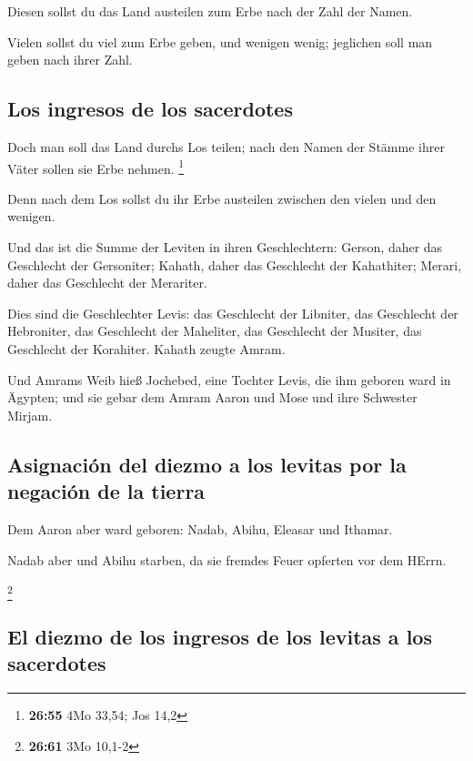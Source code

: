  Diesen sollst du das Land austeilen zum Erbe nach der
Zahl der Namen.

 Vielen sollst du viel zum Erbe geben, und wenigen wenig;
jeglichen soll man geben nach ihrer Zahl.

\hypertarget{los-ingresos-de-los-sacerdotes}{%
\subsection{Los ingresos de los
sacerdotes}\label{los-ingresos-de-los-sacerdotes}}

 Doch man soll das Land durchs Los teilen; nach den Namen
der Stämme ihrer Väter sollen sie Erbe nehmen. \footnote{\textbf{26:55}
  4Mo 33,54; Jos 14,2}

 Denn nach dem Los sollst du ihr Erbe austeilen zwischen
den vielen und den wenigen.

 Und das ist die Summe der Leviten in ihren
Geschlechtern: Gerson, daher das Geschlecht der Gersoniter; Kahath,
daher das Geschlecht der Kahathiter; Merari, daher das Geschlecht der
Merariter.

 Dies sind die Geschlechter Levis: das Geschlecht der
Libniter, das Geschlecht der Hebroniter, das Geschlecht der Maheliter,
das Geschlecht der Musiter, das Geschlecht der Korahiter. Kahath zeugte
Amram.

 Und Amrams Weib hieß Jochebed, eine Tochter Levis, die
ihm geboren ward in Ägypten; und sie gebar dem Amram Aaron und Mose und
ihre Schwester Mirjam.

\hypertarget{asignaciuxf3n-del-diezmo-a-los-levitas-por-la-negaciuxf3n-de-la-tierra}{%
\subsection{Asignación del diezmo a los levitas por la negación de la
tierra}\label{asignaciuxf3n-del-diezmo-a-los-levitas-por-la-negaciuxf3n-de-la-tierra}}

 Dem Aaron aber ward geboren: Nadab, Abihu, Eleasar und
Ithamar.

 Nadab aber und Abihu starben, da sie fremdes Feuer
opferten vor dem HErrn.

\footnote{\textbf{26:61} 3Mo 10,1-2}

\hypertarget{el-diezmo-de-los-ingresos-de-los-levitas-a-los-sacerdotes}{%
\subsection{El diezmo de los ingresos de los levitas a los
sacerdotes}\label{el-diezmo-de-los-ingresos-de-los-levitas-a-los-sacerdotes}}

